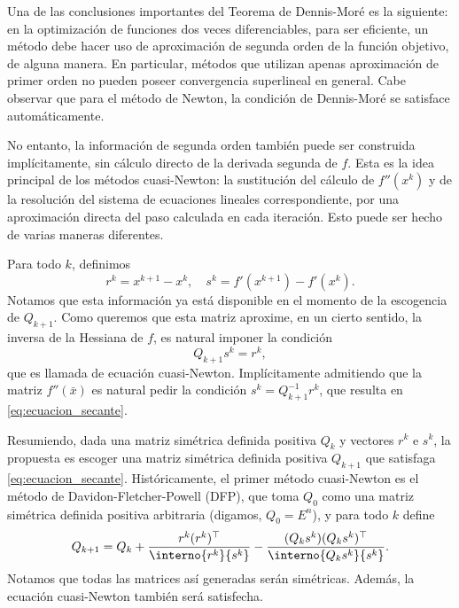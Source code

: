 Una de las conclusiones importantes del Teorema de Dennis-Moré es la siguiente: en la optimización de funciones dos veces diferenciables, para ser eficiente, un método debe hacer uso de aproximación de segunda orden de la función objetivo, de alguna manera. En particular, métodos que utilizan apenas aproximación de primer orden no pueden poseer convergencia superlineal en general. Cabe observar que para el método de Newton, la condición de Dennis-Moré se satisface automáticamente. 

No entanto, la información de segunda orden también puede ser construida implícitamente, sin cálculo directo de la derivada segunda de $f$. Esta es la idea principal de los métodos cuasi-Newton: la sustitución del cálculo de $f''(x^k)$ y de la resolución del sistema de ecuaciones lineales correspondiente, por una aproximación directa del paso calculada en cada iteración. Esto puede ser hecho de varias maneras diferentes. 

Para todo $k$, definimos
\begin{equation}
    r^k = x^{k+1} - x^k, \quad s^k = f'(x^{k+1}) - f'(x^k).
\end{equation}
Notamos que esta información ya está disponible en el momento de la escogencia de $Q_{k+1}$. Como queremos que esta matriz aproxime, en un cierto sentido, la inversa de la Hessiana de $f$, es natural imponer la condición
\begin{equation}
    Q_{k+1} s^k = r^k,
    \label{eq:ecuacion_secante}
\end{equation}
que es llamada de ecuación cuasi-Newton. Implícitamente admitiendo que la matriz $f''(\bar{x})$ es natural pedir la condición $s^k = Q_{k+1}^{-1} r^k$, que resulta en \eqref{eq:ecuacion_secante}.

Resumiendo, dada una matriz simétrica definida positiva $Q_k$ y vectores $r^k$ e $s^k$, la propuesta es escoger una matriz simétrica definida positiva $Q_{k+1}$ que satisfaga \eqref{eq:ecuacion_secante}. Históricamente, el primer método cuasi-Newton es el método de Davidon-Fletcher-Powell (DFP), que toma $Q_0$ como una matriz simétrica definida positiva arbitraria (digamos, $Q_0 = E^n$), y para todo $k$ define
\begin{equation}
    Q_{k+1} = Q_k + \frac{r^k (r^k)^\top}{\interno{r^k}{s^k}} - \frac{(Q_k s^k)(Q_k s^k)^\top}{\interno{Q_k s^k}{s^k}}.
    \label{eq:dfp_update}
\end{equation}
Notamos que todas las matrices así generadas serán simétricas. Además, la ecuación cuasi-Newton también será satisfecha.

